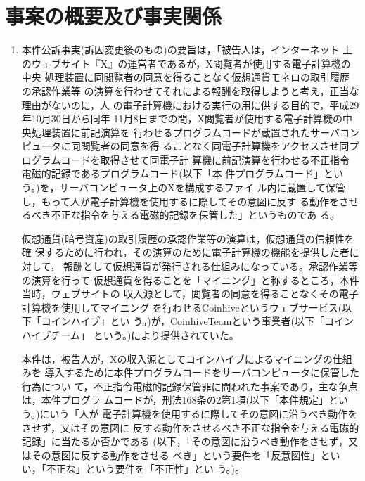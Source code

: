 \documentclass[12pt,a4paper]{ltjsarticle}
\begin{document}
 \section{事案の概要及び事実関係}
 \begin{enumerate}
  \item
       本件公訴事実(訴因変更後のもの)の要旨は，「被告人は，インターネット
        上のウェブサイト『X』の運営者であるが，X閲覧者が使用する電子計算機の中央
        処理装置に同閲覧者の同意を得ることなく仮想通貨モネロの取引履歴の承認作業等
        の演算を行わせてそれによる報酬を取得しようと考え，正当な理由がないのに，人
        の電子計算機における実行の用に供する目的で，平成29年10月30日から同年
        11月8日までの間，X閲覧者が使用する電子計算機の中央処理装置に前記演算を
        行わせるプログラムコードが蔵置されたサーバコンピュータに同閲覧者の同意を得
        ることなく同電子計算機をアクセスさせ同プログラムコードを取得させて同電子計
        算機に前記演算を行わせる不正指令電磁的記録であるプログラムコード(以下「本
        件プログラムコード」という。)を，サーバコンピュータ上のXを構成するファイ
        ル内に蔵置して保管し，もって人が電子計算機を使用するに際してその意図に反す
        る動作をさせるべき不正な指令を与える電磁的記録を保管した」というものであ
        る。

        仮想通貨(暗号資産)の取引履歴の承認作業等の演算は，仮想通貨の信頼性を確
        保するために行われ，その演算のために電子計算機の機能を提供した者に対して，
        報酬として仮想通貨が発行される仕組みになっている。承認作業等の演算を行って
        仮想通貨を得ることを「マイニング」と称するところ，本件当時，ウェブサイトの
        収入源として，閲覧者の同意を得ることなくその電子計算機を使用してマイニング
        を行わせるCoinhiveというウェブサービス(以下「コインハイブ」とい
        う。)が，CoinhiveTeamという事業者(以下「コインハイブチーム」
        という。)により提供されていた。

        本件は，被告人が，Xの収入源としてコインハイブによるマイニングの仕組みを
        導入するために本件プログラムコードをサーバコンピュータに保管した行為につい
        て，不正指令電磁的記録保管罪に問われた事案であり，主な争点は，本件プログラ
        ムコードが，刑法168条の2第1項(以下「本件規定」という。)にいう「人が
        電子計算機を使用するに際してその意図に沿うべき動作をさせず，又はその意図に
        反する動作をさせるべき不正な指令を与える電磁的記録」に当たるか否かである
        (以下，「その意図に沿うべき動作をさせず，又はその意図に反する動作をさせる
        べき」という要件を「反意図性」といい，「不正な」という要件を「不正性」とい
        う。)。


\end{enumerate}
\end{document}
